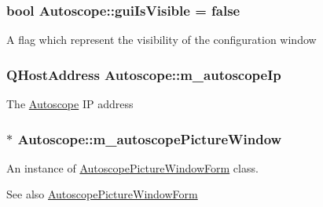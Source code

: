 \subsubsection[{\texorpdfstring{gui\+Is\+Visible}{guiIsVisible}}]{\setlength{\rightskip}{0pt plus 5cm}bool Autoscope\+::gui\+Is\+Visible = false\hspace{0.3cm}{\ttfamily [private]}}\hypertarget{class_autoscope_ac995550136b93293df166aead2eda5b7}{}\label{class_autoscope_ac995550136b93293df166aead2eda5b7}
A flag which represent the visibility of the configuration window 
\subsubsection[{\texorpdfstring{m\+\_\+autoscope\+Ip}{m_autoscopeIp}}]{\setlength{\rightskip}{0pt plus 5cm}Q\+Host\+Address Autoscope\+::m\+\_\+autoscope\+Ip\hspace{0.3cm}{\ttfamily [private]}}\hypertarget{class_autoscope_aa3c1b8d19881d76c680b8c4ea1692c89}{}\label{class_autoscope_aa3c1b8d19881d76c680b8c4ea1692c89}
The \hyperlink{class_autoscope}{Autoscope} IP address 
\subsubsection[{\texorpdfstring{m\+\_\+autoscope\+Picture\+Window}{m_autoscopePictureWindow}}]{$\ast$ Autoscope\+::m\+\_\+autoscope\+Picture\+Window\hspace{0.3cm}{\ttfamily [private]}}\hypertarget{class_autoscope_a75a50ab46f25c007b9a86d3776385fc6}{}\label{class_autoscope_a75a50ab46f25c007b9a86d3776385fc6}


An instance of \hyperlink{class_autoscope_picture_window_form}{Autoscope\+Picture\+Window\+Form} class. 

\begin{DoxySeeAlso}{See also}
\hyperlink{class_autoscope_picture_window_form}{Autoscope\+Picture\+Window\+Form} 
\end{DoxySeeAlso}
